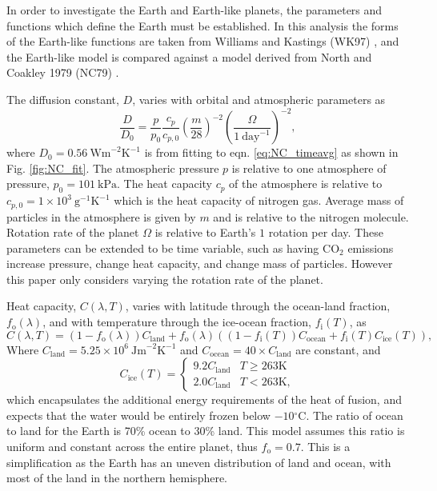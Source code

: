 \documentclass[12pt, onecolumn]{revtex4-2}    %
\newcommand{\heatcap}{\ensuremath{\ \text{Jm}^{-2} \text{K}^{-1}}}
\newcommand{\diffusion}{\ensuremath{\ \text{Wm}^{-2} \text{K}^{-1}}}
\newcommand{\degrees}{\ensuremath{^{\circ}}}
\begin{document}
In order to investigate the Earth and Earth-like planets, the parameters and functions which define the Earth must be established.
In this analysis the forms of the Earth-like functions are taken from Williams and Kastings (WK97) \cite{WK97}, and the Earth-like model is compared against a model derived from North and Coakley 1979 (NC79) \cite{NC79}.


The diffusion constant, $D$, varies with orbital and atmospheric parameters as
\begin{equation}
  \frac{D}{D_0} = \frac{p}{p_0} \frac{c_p}{c_{p,0}} \left(\frac{m}{28}\right)^{-2} \left(\frac{\Omega}{1\ \text{day}^{-1}}\right)^{-2},
  \label{eq:diffusion_eqn}
\end{equation}
where $D_0 = 0.56 \diffusion$ is from fitting to eqn. \ref{eq:NC_timeavg} as shown in Fig. \ref{fig:NC_fit}.
The atmospheric pressure $p$ is relative to one atmosphere of pressure, $p_0 = 101 \ \text{kPa}$.
The heat capacity $c_p$ of the atmosphere is relative to $c_{p,0} = 1\times10^3 \ \text{g}^{-1} \text{K}^{-1}$ which is the heat capacity of nitrogen gas.
Average mass of particles in the atmosphere is given by $m$ and is relative to the nitrogen molecule.
Rotation rate of the planet $\Omega$ is relative to Earth's $1$ rotation per day.
These parameters can be extended to be time variable, such as having CO$_2$ emissions increase pressure, change heat capacity, and change mass of particles.
However this paper only considers varying the rotation rate of the planet. %

Heat capacity, $C(\lambda, T)$, varies with latitude through the ocean-land fraction, $f_\text{o}(\lambda)$, and with temperature through the ice-ocean fraction, $f_\text{i}(T)$, as
\begin{equation}
  C(\lambda, T) = (1 - f_\text{o}(\lambda)) C_\text{land} + f_\text{o}(\lambda) ((1-f_\text{i}(T)) C_\text{ocean} + f_\text{i}(T) C_\text{ice}(T)),
\end{equation}
Where $C_{\text{land}} = 5.25\times10^6 \heatcap$ and $C_{\text{ocean}} = 40 \times C_{\text{land}}$ are constant, and
\begin{equation}
  C_{\text{ice}}(T) =
  \begin{cases}
    9.2 C_\text{land} & T \ge 263\text{K} \\
    2.0 C_\text{land} & T < 263\text{K},
  \end{cases}
\end{equation}
which encapsulates the additional energy requirements of the heat of fusion, and expects that the water would be entirely frozen below $-10\degrees$C.
The ratio of ocean to land for the Earth is 70\% ocean to 30\% land.
This model assumes this ratio is uniform and constant across the entire planet, thus $f_\text{o} = 0.7$.
This is a simplification as the Earth has an uneven distribution of land and ocean, with most of the land in the northern hemisphere.
\end{document}
